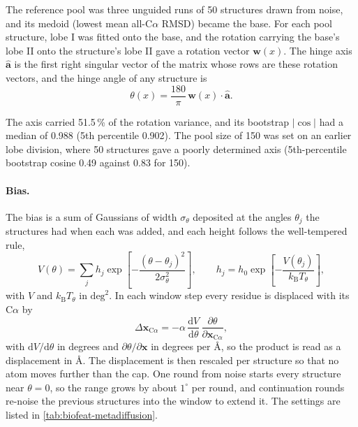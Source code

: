 The reference pool was three unguided runs of 50 structures drawn from noise, and its medoid (lowest mean all-C$\alpha$ RMSD) became the base. For each pool structure, lobe I was fitted onto the base, and the rotation carrying the base's lobe II onto the structure's lobe II gave a rotation vector $\mathbf{w}(x)$. The hinge axis $\hat{\mathbf{a}}$ is the first right singular vector of the matrix whose rows are these rotation vectors, and the hinge angle of any structure is
\begin{equation}
    \theta(x)=\frac{180}{\pi}\,\mathbf{w}(x)\cdot\hat{\mathbf{a}}.
    \label{eq:biofeat-theta}
\end{equation}

The axis carried 51.5\,\% of the rotation variance, and its bootstrap $|\cos|$ had a median of 0.988 (5th percentile 0.902). The pool size of 150 was set on an earlier lobe division, where 50 structures gave a poorly determined axis (5th-percentile bootstrap cosine 0.49 against 0.83 for 150).

\paragraph{Bias.}
The bias is a sum of Gaussians of width $\sigma_\theta$ deposited at the angles $\theta_j$ the structures had when each was added, and each height follows the well-tempered rule,\supercite{barducciWelltemperedMetadynamicsSmoothly2008}
\begin{equation}
    V(\theta)=\sum_j h_j\exp\!\left[-\frac{(\theta-\theta_j)^2}{2\sigma_\theta^2}\right],
    \qquad
    h_j=h_0\exp\!\left[-\frac{V(\theta_j)}{k_\mathrm{B}T_\theta}\right],
    \label{eq:biofeat-metad-bias}
\end{equation}
with $V$ and $k_\mathrm{B}T_\theta$ in $\mathrm{deg}^2$. In each window step every residue is displaced with its C$\alpha$ by
\begin{equation}
    \Delta\mathbf{x}_{\mathrm{C}\alpha}=-\alpha\,\frac{\mathrm{d}V}{\mathrm{d}\theta}\,\frac{\partial\theta}{\partial\mathbf{x}_{\mathrm{C}\alpha}},
    \label{eq:biofeat-metad-move}
\end{equation}
with $\mathrm{d}V/\mathrm{d}\theta$ in degrees and $\partial\theta/\partial\mathbf{x}$ in degrees per \AA, so the product is read as a displacement in \AA. The displacement is then rescaled per structure so that no atom moves further than the cap. One round from noise starts every structure near $\theta=0$, so the range grows by about $1^\circ$ per round, and continuation rounds re-noise the previous structures into the window to extend it. The settings are listed in \cref{tab:biofeat-metadiffusion}.

